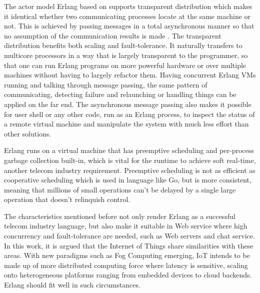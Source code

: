 The actor model Erlang based on supports transparent distribution which makes it identical whether two communicating processes locate at the same machine or not. This is achieved by passing messages in a total asynchronous manner so that no assumption of the communication results is made \autocite{learn_you_some_erlang}. The transparent distribution benefits both scaling and fault-tolerance. It naturally transfers to multicore processors in a way that is largely transparent to the programmer, so that one can run Erlang programs on more powerful hardware or over multiple machines without having to largely refactor them. Having concurrent Erlang VMs running and talking through message passing, the same pattern of communicating, detecting failure and relaunching or handling things can be applied on the far end. The asynchronous message passing also makes it possible for user shell or any other code, run as an Erlang process, to inspect the status of a remote virtual machine and manipulate the system with much less effort than other solutions.  

Erlang runs on a virtual machine that has preemptive scheduling and per-process garbage collection built-in, which is vital for the runtime to achieve soft real-time, another telecom industry requirement. Preemptive scheduling is not as efficient as cooperative scheduling which is used in language like Go, but is more consistent, meaning that millions of small operations can't be delayed by a single large operation that doesn't relinquish control. 

The characteristics mentioned before not only render Erlang as a successful telecom industry language, but also make it suitable in Web service where high concurrency and fault-tolerance are needed, such as Web servers and chat service. In this work, it is argued that the Internet of Things share similarities with these areas. With new paradigms such as Fog Computing emerging, IoT intends to be made up of more distributed computing force where latency is sensitive, scaling onto heterogeneous platforms ranging from embedded devices to cloud backends. Erlang should fit well in such circumstances. 

